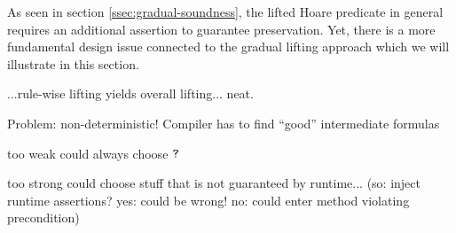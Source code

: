 
As seen in section \ref{ssec:gradual-soundness}, the lifted Hoare predicate in general requires an additional assertion to guarantee preservation.
Yet, there is a more fundamental design issue connected to the gradual lifting approach which we will illustrate in this section.

...rule-wise lifting yields overall lifting... neat.

Problem: non-deterministic! Compiler has to find “good” intermediate formulas
\begin{decription}
    \item[too weak] could always choose $\texttt{?}$
    \item[too strong] could choose stuff that is not guaranteed by runtime... (so: inject runtime assertions? yes: could be wrong! no: could enter method violating precondition)
\end{decription}
